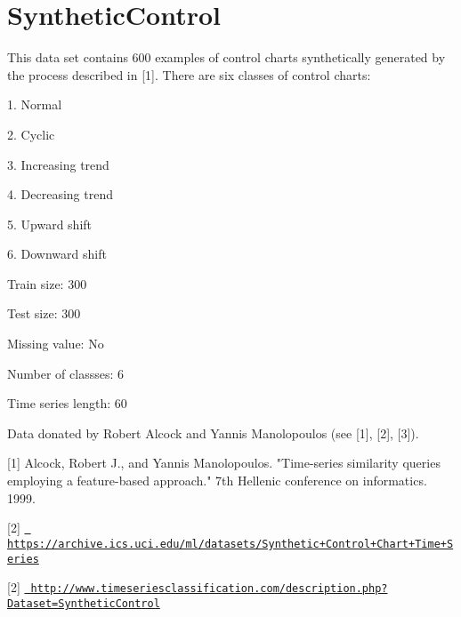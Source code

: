 \chapter{Synthetic\+Control}
\hypertarget{md_external_2data_2UCRArchive__2018_2SyntheticControl_2README}{}\label{md_external_2data_2UCRArchive__2018_2SyntheticControl_2README}
\label{md_external_2data_2UCRArchive__2018_2SyntheticControl_2README_autotoc_md218}%
%
 This data set contains 600 examples of control charts synthetically generated by the process described in \mbox{[}1\mbox{]}. There are six classes of control charts\+:
\begin{DoxyItemize}
\item 1. Normal
\item 2. Cyclic
\item 3. Increasing trend
\item 4. Decreasing trend
\item 5. Upward shift
\item 6. Downward shift
\end{DoxyItemize}

Train size\+: 300

Test size\+: 300

Missing value\+: No

Number of classses\+: 6

Time series length\+: 60

Data donated by Robert Alcock and Yannis Manolopoulos (see \mbox{[}1\mbox{]}, \mbox{[}2\mbox{]}, \mbox{[}3\mbox{]}).

\mbox{[}1\mbox{]} Alcock, Robert J., and Yannis Manolopoulos. "{}\+Time-\/series similarity queries employing a feature-\/based approach."{} 7th Hellenic conference on informatics. 1999.

\mbox{[}2\mbox{]} \href{https://archive.ics.uci.edu/ml/datasets/Synthetic+Control+Chart+Time+Series}{\texttt{ https\+://archive.\+ics.\+uci.\+edu/ml/datasets/\+Synthetic+\+Control+\+Chart+\+Time+\+Series}}

\mbox{[}2\mbox{]} \href{http://www.timeseriesclassification.com/description.php?Dataset=SyntheticControl}{\texttt{ http\+://www.\+timeseriesclassification.\+com/description.\+php?\+Dataset=\+Synthetic\+Control}} 
